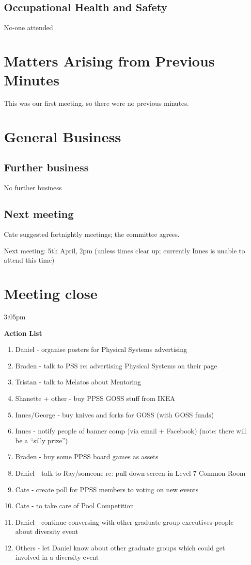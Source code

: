 \documentclass[a4paper,11pt]{article}
\begin{document}
\subsection{Occupational Health and Safety}

No-one attended	

\section{Matters Arising from Previous Minutes}

This was our first meeting, so there were no previous minutes.

\section{General Business}
\subsection{Further business}
No further business

\subsection{Next meeting}
Cate suggested fortnightly meetings; the committee agrees.
	
Next meeting: 5th April, 2pm (unless times clear up; currently Innes is unable to attend this time)	
	
\section{Meeting close}

	3:05pm

\pagebreak
{\Large \textbf{Action List}}

\begin{enumerate}
\item Daniel - organise posters for Physical Systems advertising
\item Braden - talk to PSS re: advertising Physical Systems on their page
\item Tristan - talk to Melatos about Mentoring
\item Shanette + other - buy PPSS GOSS stuff from IKEA
\item Innes/George - buy knives and forks for GOSS (with GOSS funds)
\item Innes - notify people of banner comp (via email + Facebook) (note: there will be a ``silly prize'')
\item Braden - buy some PPSS board games as assets
\item Daniel - talk to Ray/someone re: pull-down screen in Level 7 Common Room
\item Cate - create poll for PPSS members to voting on new events
\item Cate - to take care of Pool Competition
\item Daniel - continue conversing with other graduate group executives people about diversity event
\item Others - let Daniel know about other graduate groups which could get involved in a diversity event
\end{enumerate}
\end{document}
